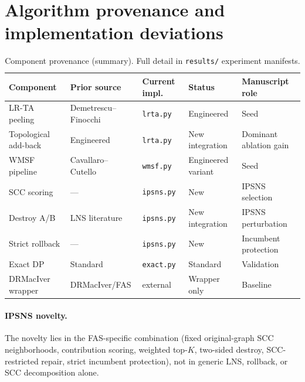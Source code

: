 \section{Algorithm provenance and implementation deviations}
\label{sec:or1-provenance-table}

\begin{table}[h]
\centering\small
\caption{Component provenance (summary). Full detail in \texttt{results/} experiment manifests.}
\begin{tabular}{p{2.2cm}p{2.5cm}p{2.5cm}p{1.5cm}p{2.8cm}}
\toprule
Component & Prior source & Current impl. & Status & Manuscript role \\
\midrule
LR-TA peeling & Demetrescu--Finocchi & \texttt{lrta.py} & Engineered & Seed \\
Topological add-back & Engineered & \texttt{lrta.py} & New integration & Dominant ablation gain \\
WMSF pipeline & Cavallaro--Cutello & \texttt{wmsf.py} & Engineered variant & Seed \\
SCC scoring & --- & \texttt{ipsns.py} & New & IPSNS selection \\
Destroy A/B & LNS literature & \texttt{ipsns.py} & New integration & IPSNS perturbation \\
Strict rollback & --- & \texttt{ipsns.py} & New & Incumbent protection \\
Exact DP & Standard & \texttt{exact.py} & Standard & Validation \\
DRMacIver wrapper & DRMacIver/FAS & external & Wrapper only & Baseline \\
\bottomrule
\end{tabular}
\end{table}

\paragraph{IPSNS novelty.} The novelty lies in the FAS-specific combination (fixed original-graph SCC neighborhoods, contribution scoring, weighted top-$K$, two-sided destroy, SCC-restricted repair, strict incumbent protection), not in generic LNS, rollback, or SCC decomposition alone.
